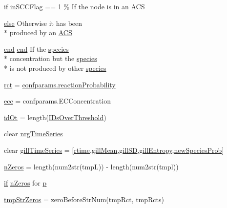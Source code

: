 \begin{DoxyCompactItemize}
\item 
\hyperlink{a00030_a01d55766b8058903dd360b4bda71f9f5}{if} \hyperlink{a00028_af1605fa33751cda7e0c840d6df8f8a59}{in\-S\-C\-C\-Flag} == 1 \% If the node is in an \hyperlink{a00028_ad72e1068795c577213481e5db7f3e925}{A\-C\-S}
\item 
\hyperlink{a00031_af5946383720aa572eb93e1e63afc23c2}{else} Otherwise it has been \\*
produced by an \hyperlink{a00028_ad72e1068795c577213481e5db7f3e925}{A\-C\-S}
\item 
\hyperlink{a00025_afb358f48b1646c750fb9da6c6585be2b}{end} \hyperlink{a00025_afb358f48b1646c750fb9da6c6585be2b}{end} If the \hyperlink{a00022}{species} \\*
concentration but the \hyperlink{a00022}{species} \\*
is not produced by other \hyperlink{a00028_ad7a297e3111ffc45eba4a3b88590cb30}{species}
\item 
\hyperlink{a00028_a188d6e4d5a19aaeb1532fc5b9791afba}{rct} = \hyperlink{a00113_a9101beaeb03fddb5c6a9e68442177543}{confparams.\-reaction\-Probability}
\item 
\hyperlink{a00028_a4c229c44edda979d1be7b28b83e5e8b9}{ecc} = confparams.\-E\-C\-Concentration
\item 
\hyperlink{a00028_ad5352b3d09cda91b8c5f90532900abeb}{id\-Ot} = length(\hyperlink{a00028_a67c695f856b6731644c6a128e602a323}{I\-Ds\-Over\-Threshold})
\item 
clear \hyperlink{a00028_ad5f4092827ae220bd7c53532aaaa0590}{nrg\-Time\-Series}
\item 
clear \hyperlink{a00028_ad7c5b4f5873064fed5ce2b70ce073f91}{gill\-Time\-Series} = \mbox{[}\hyperlink{a00028_afc6b38657a313b9f1de2ee356910b6ee}{rtime},\hyperlink{a00028_a7d36858faf2f8bb5963306c86db2b549}{gill\-Mean},\hyperlink{a00028_a187931f510c22818692d094c8026ebd1}{gill\-S\-D},\hyperlink{a00028_aef2e92fdea881fe7819bf51b2d7e0783}{gill\-Entropy},\hyperlink{a00028_aa66147edba72bc0b9cf591cd7475396f}{new\-Species\-Prob}\mbox{]}
\item 
\hyperlink{a00028_ac4353d99277795cadf898255e2c73c71}{n\-Zeros} = length(num2str(tmp\-L)) -\/ length(num2str(tmpl))
\item 
\hyperlink{a00030_a01d55766b8058903dd360b4bda71f9f5}{if} \hyperlink{a00028_ac4353d99277795cadf898255e2c73c71}{n\-Zeros} for \hyperlink{a00028_aa2b4c35904308d35fc5d606a429e608d}{p}
\item 
\hyperlink{a00028_aacf946bee61c4c535a7bf6d85f55f66a}{tmp\-Str\-Zeros} = zero\-Before\-Str\-Num(tmp\-Rct, tmp\-Rcts)

\end{DoxyCompactItemize}
